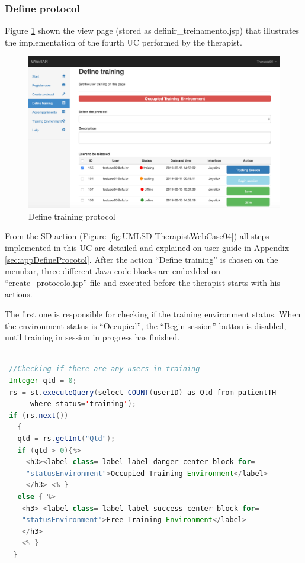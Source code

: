 \subsubsection{Define protocol}
\label{sec:definedProtocol}

Figure \ref{fig:tDefineProtocol01} shown the view page (stored as definir\_treinamento.jsp) that illustrates the implementation of the fourth UC performed by the therapist.

\begin{figure}[!hbt]
\begin{center}
\includegraphics[width=1\linewidth]{img/cap5/tDefineProtocol01}
\caption{Define training protocol} \label{fig:tDefineProtocol01}
\end{center}
\end{figure}

From the SD action (Figure \ref{fig:UMLSD-TherapistWebCase04}) all steps implemented in this UC are detailed and explained on user guide in Appendix \ref{sec:appDefineProcotol}. After the action ``Define training'' is chosen on the menubar, three different Java code blocks are embedded on ``create\_protocolo.jsp'' file and executed before the therapist starts with his actions.

The first one is responsible for checking if the training environment status. When the environment status is ``Occupied'', the ``Begin session'' button is disabled, until training in session in progress has finished. 

\begin{lstlisting}[frame=single,language=Java]  % Start your code-block

 //Checking if there are any users in training
 Integer qtd = 0;
 rs = st.executeQuery(select COUNT(userID) as Qtd from patientTH 
      where status='training');
 if (rs.next()) 
   {
   qtd = rs.getInt("Qtd");
   if (qtd > 0){%>
     <h3><label class= label label-danger center-block for=
     "statusEnvironment">Occupied Training Environment</label>
     </h3> <% }
   else { %>
    <h3> <label class= label label-success center-block for=
    "statusEnvironment">Free Training Environment</label>
    </h3>
    <% }
  }
\end{lstlisting}

